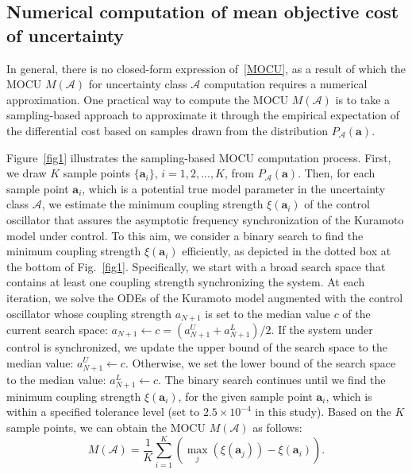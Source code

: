 \documentclass{article}
\begin{document}
\subsection{Numerical computation of mean objective cost of uncertainty}
\label{samplingBasedMOCU}
In general, there is no closed-form expression of~\eqref{MOCU}, as a result of which the MOCU ${M\left(\mathbf{\mathcal{A}}\right)}$ for uncertainty class ${\mathbf{\mathcal{A}}}$ computation requires a numerical approximation. One practical way to compute the MOCU ${M\left(\mathbf{\mathcal{A}}\right)}$ is to take a sampling-based approach to approximate it through the empirical expectation of the differential cost based on samples drawn from the distribution ${P_{\mathbf{\mathcal{A}}}\left( \mathbf{a} \right)}$.

Figure~\ref{fig1} illustrates the sampling-based MOCU computation process. First, we draw ${K}$ sample points ${\{\mathbf{a}_i\}}$, ${i= 1, 2, ..., K}$, from ${P_{\mathbf{\mathcal{A}}}\left( \mathbf{a} \right)}$. Then, for each sample point ${\mathbf{a}_i}$, which is a potential true model parameter in the uncertainty class $\mathbf{\mathcal{A}}$, we estimate the minimum coupling strength ${\xi\left( \mathbf{a}_i\right)}$ of the control oscillator that assures the asymptotic frequency synchronization of the Kuramoto model under control. To this aim, we consider a binary search to find the minimum coupling strength ${\xi\left( \mathbf{a}_i\right)}$ efficiently, as depicted in the dotted box at the bottom of Fig.~\ref{fig1}. Specifically, we start with a broad search space that contains at least one coupling strength synchronizing the system. At each iteration, we solve the ODEs of the Kuramoto model augmented with the control oscillator whose coupling strength ${a_{N+1}}$ is set to the median value ${c}$ of the current search space: ${a_{N+1}\leftarrow c = \left({a^U_{N+1}}+{a^L_{N+1}}\right)/2}$. If the system under control is synchronized, we update the upper bound of the search space to the median value: ${a^U_{N+1}\leftarrow c}$. Otherwise, we set the lower bound of the search space to the median value: ${a^L_{N+1}\leftarrow c}$. The binary search continues until we find the minimum coupling strength ${\xi\left( \mathbf{a}_i\right)}$, for the given sample point ${\mathbf{a}_i}$, which is within a specified tolerance level (set to $2.5 \times 10^{-4}$ in this study). Based on the $K$ sample points, we can obtain the MOCU ${M\left(\mathbf{\mathcal{A}}\right)}$ as follows:
\begin{equation}
    M\left( \mathbf{\mathcal{A}}\right) =  \frac{1}{K} \sum^K_{i = 1} \left( \max_j  \left(\xi\left(\mathbf{a}_j \right) \right) - \xi\left(\mathbf{a}_i \right) \right).
\end{equation}
\end{document}
